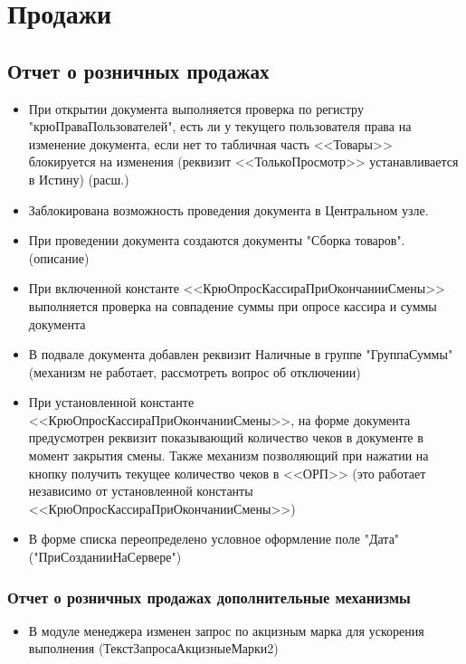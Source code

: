 \section{Продажи}
\subsection{Отчет о розничных продажах}


\begin{itemize}
	\item При открытии документа выполняется проверка по регистру "крюПраваПользователей", есть ли у текущего пользователя права на изменение документа, если нет то табличная часть <<Товары>> блокируется на изменения (реквизит <<ТолькоПросмотр>> устанавливается в Истину) (расш.)
	\item Заблокирована возможность проведения документа в Центральном узле.
	\item При проведении документа создаются документы "Сборка товаров".(описание)
	\item При включенной константе <<КрюОпросКассираПриОкончанииСмены>> выполняется проверка на совпадение суммы при опросе кассира и суммы документа
	\item В подвале документа добавлен реквизит Наличные в группе "ГруппаСуммы" (механизм не работает, рассмотреть вопрос об отключении)
	\item При установленной константе <<КрюОпросКассираПриОкончанииСмены>>,  на форме документа предусмотрен реквизит показывающий количество чеков в документе в момент закрытия смены. Также механизм позволяющий при нажатии на кнопку  получить текущее количество чеков в <<ОРП>> (это работает независимо от установленной константы <<КрюОпросКассираПриОкончанииСмены>>)
	\item В форме списка переопределено условное оформление поле "Дата" ("ПриСозданииНаСервере")


\end{itemize}

\subsubsection{Отчет о розничных продажах дополнительные механизмы}
\begin{itemize}
	\item В модуле менеджера изменен запрос по акцизным марка для ускорения выполнения (ТекстЗапросаАкцизныеМарки2)
\end{itemize}



